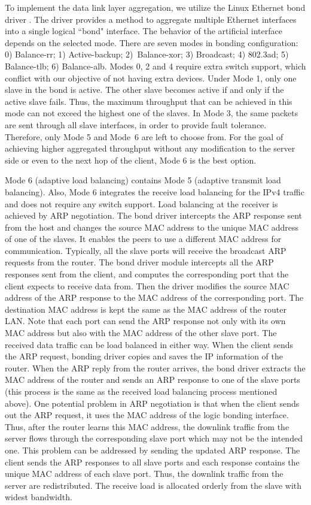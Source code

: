 \documentclass[10pt,journal]{IEEEtran}
\begin{document}
To implement the data link layer aggregation, we utilize the Linux Ethernet bond driver \cite{davis2011linux}. The driver provides a method to aggregate multiple Ethernet interfaces into a single logical ``bond" interface. The behavior of the artificial interface depends on the selected mode. There are seven modes in bonding configuration: 0) Balance-rr; 1) Active-backup; 2)~Balance-xor; 3) Broadcast; 4) 802.3ad; 5) Balance-tlb; 6) Balance-alb. Modes 0, 2 and 4 require extra switch support, which conflict with our objective of not having extra devices. Under Mode 1, only one slave in the bond is active. The other slave becomes active if and only if the active slave fails. Thus, the maximum throughput that can be achieved in this mode can not exceed the highest one of the slaves. In Mode 3, the same packets are sent through all slave interfaces, in order to provide fault tolerance. Therefore, only Mode 5 and Mode~6 are left to choose from. For the goal of achieving higher aggregated throughput without any modification to the server side or even to the next hop of the client, Mode 6 is the best option.

Mode 6 (adaptive load balancing) contains Mode 5 (adaptive transmit load balancing). Also, Mode 6 integrates the receive load balancing for the IPv4 traffic and does not require any switch support. Load balancing at the receiver is achieved by ARP negotiation. The bond driver intercepts the ARP response sent from the host and changes the source MAC address to the unique MAC address of one of the slaves. It enables the peers to use a different MAC address for communication. Typically, all the slave ports will receive the broadcast ARP requests from the router. The bond driver module intercepts all the ARP responses sent from the client, and computes the corresponding port that the client expects to receive data from. Then the driver modifies the source MAC address of the ARP response to the MAC address of the corresponding port. The destination MAC address is kept the same as the MAC address of the router LAN. Note that each port can send the ARP response not only with its own MAC address but also with the MAC address of the other slave port. The received data traffic can be load balanced in either way. When the client sends the ARP request, bonding driver copies and saves the IP information of the router. When the ARP reply from the router arrives, the bond driver extracts the MAC address of the router and sends an ARP response to one of the slave ports (this process is the same as the received load balancing process mentioned above). One potential problem in ARP negotiation is that when the client sends out the ARP request, it uses the MAC address of the logic bonding interface. Thus, after the router learns this MAC address, the downlink traffic from the server flows through the corresponding slave port which may not be the intended one. This problem can be addressed by sending the updated ARP response. The client sends the ARP responses to all slave ports and each response contains the unique MAC address of each slave port. Thus, the downlink traffic from the server are redistributed. The receive load \cite{davis2011linux} is allocated orderly from the slave with widest bandwidth.
\end{document}
